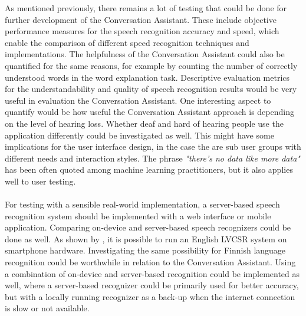 \documentclass[english, 12pt, a4paper, pdftex, elec, utf8]{aaltothesis}
\begin{document}
As mentioned previously, there remains a lot of testing that could be done for further development of the Conversation Assistant. These include objective performance measures for the speech recognition accuracy and speed, which enable the comparison of different speed recognition techniques and implementations. The helpfulness of the Conversation Assistant could also be quantified for the same reasons, for example by counting the number of correctly understood words in the word explanation task. Descriptive evaluation metrics for the understandability and quality of speech recognition results would be very useful in evaluation the Conversation Assistant. One interesting aspect to quantify would be how useful the Conversation Assistant approach is depending on the level of hearing loss. Whether deaf and hard of hearing people use the application differently could be investigated as well. This might have some implications for the user interface design, in the case the are sub user groups with different needs and interaction styles. The phrase \textit{"there's no data like more data"} has been often quoted among machine learning practitioners, but it also applies well to user testing. \\\\ 
For testing with a sensible real-world implementation, a server-based speech recognition system should be implemented with a web interface or mobile application. Comparing on-device and server-based speech recognizers could be done as well. As shown by \cite{mcgraw2016personalized}, it is possible to run an English LVCSR system on smartphone hardware. Investigating the same possibility for Finnish language recognition could be worthwhile in relation to the Conversation Assistant. Using a combination of on-device and server-based recognition could be implemented as well, where a server-based recognizer could be primarily used for better accuracy, but with a locally running recognizer as a back-up when the internet connection is slow or not available. \\\\
\end{document}
